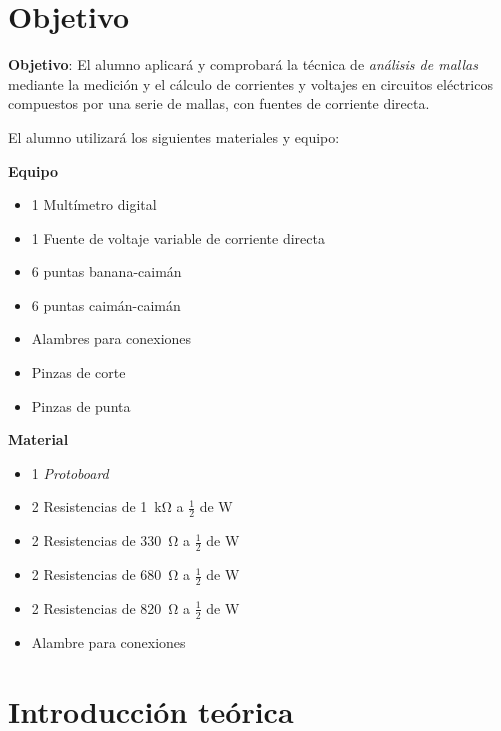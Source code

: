 \documentclass[a4paper,12pt]{article}
\begin{document}

\section*{Objetivo}

\textbf{Objetivo}: El alumno aplicará y comprobará la técnica de \emph{análisis de mallas} mediante la
medición y el cálculo de corrientes y voltajes en circuitos eléctricos compuestos
por una serie de mallas, con fuentes de corriente directa. \par

\vspace{0.5cm}

El alumno utilizará los siguientes materiales y equipo:

\begin{multicols}{2}
\textbf{Equipo}\\
\begin{itemize}[nosep]
	\item 1 Multímetro digital
	\item 1 Fuente de voltaje variable de corriente directa
	\item 6 puntas banana-caimán
	\item 6 puntas caimán-caimán
	\item Alambres para conexiones
	\item Pinzas de corte
	\item Pinzas de punta
\end{itemize}

\columnbreak

\textbf{Material}\\
\begin{itemize}[nosep]
	\item 1 \textit{Protoboard}
	\item 2 Resistencias de \SI{1}{\kohm} a $\frac{1}{2}$ de \si{\watt}
	\item 2 Resistencias de \SI{330}{\ohm} a $\frac{1}{2}$ de \si{\watt}
	\item 2 Resistencias de \SI{680}{\ohm} a $\frac{1}{2}$ de \si{\watt}
	\item 2 Resistencias de \SI{820}{\ohm} a $\frac{1}{2}$ de \si{\watt}
	\item Alambre para conexiones
	
\end{itemize}

\end{multicols}

\section{Introducción teórica}
\end{document}
